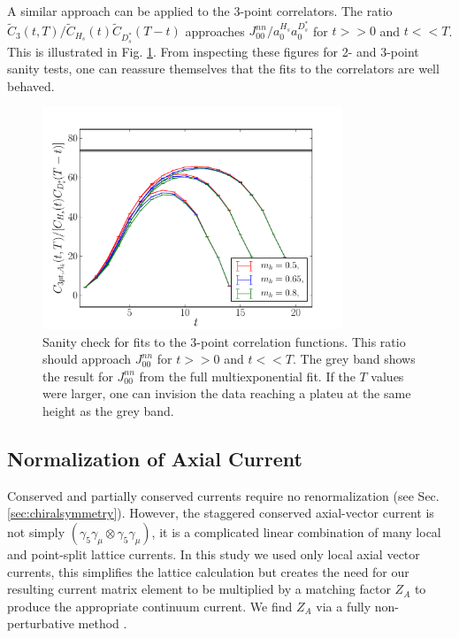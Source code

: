 A similar approach can be applied to the 3-point correlators. The ratio $\tilde{C}_3(t,T)/\tilde{C}_{H_s}(t) \tilde{C}_{D_s^*}(T-t)$ approaches $J_{00}^{nn}/a_0^{H_s}a_0^{D^*_s}$ for $t>>0$ and $t<<T$. This is illustrated in Fig. \ref{eq:3pt-summary_BsDsstar}. From inspecting these figures for 2- and 3-point sanity tests, one can reassure themselves that the fits to the correlators are well behaved.

\begin{figure}[htb!]
  \begin{center}
    \vspace{-10pt}
  \includegraphics[width=0.8\textwidth]{images/BsDsstar/3ptsummary_fine.pdf}
  \caption{Sanity check for fits to the 3-point correlation functions. This ratio should approach $J_{00}^{nn}$ for $t>>0$ and $t<<T$. The grey band shows the result for $J_{00}^{nn}$ from the full multiexponential fit. If the $T$ values were larger, one can invision the data reaching a plateu at the same height as the grey band. \label{eq:3pt-summary_BsDsstar}}
  \end{center}
  \vspace{-10pt}
\end{figure}

\subsection{Normalization of Axial Current}

Conserved and partially conserved currents require no renormalization (see Sec. \ref{sec:chiralsymmetry}). However, the staggered conserved axial-vector current is not simply $(\gamma_5\gamma_{\mu}\otimes \gamma_5\gamma_{\mu})$, it is a complicated linear combination of many local and point-split lattice currents. In this study we used only local axial vector currents, this simplifies the lattice calculation but creates the need for our resulting current matrix element to be multiplied by a matching factor $Z_A$ to produce the appropriate continuum current. We find $Z_A$ via a fully non-perturbative method \cite{McNeile:2011ng,Donald:2013pea}.

